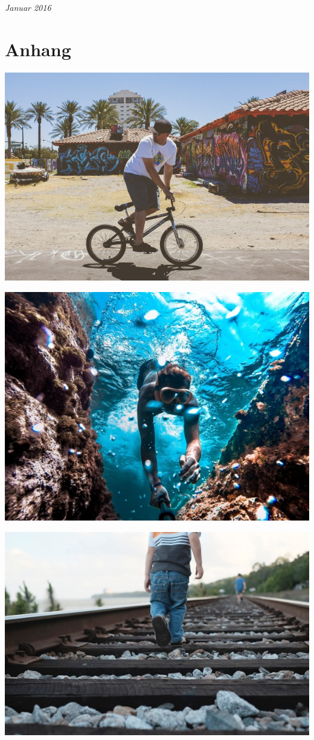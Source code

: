 \documentclass[12pt]{book}
\begin{document}
\Blindtext

\emph{Januar 2016}

\clearpage

\chapter{Anhang}

\includegraphics[width=1\textwidth]{images/bike800.jpg}

\includegraphics[width=1\textwidth]{images/dive600x450.jpg}

\includegraphics[width=1\textwidth]{images/gleis600x450.jpg}
\end{document}
